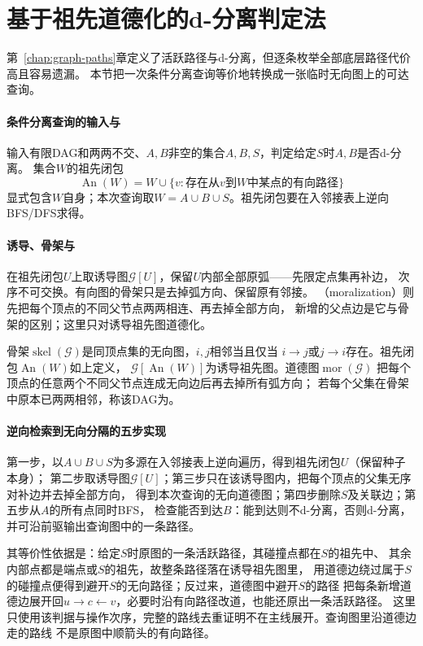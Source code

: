 \section{基于祖先道德化的d-分离判定法}
\label{sec:graph-theory-directed-transformations}

第~\ref{chap:graph-paths}章定义了活跃路径与d-分离，但逐条枚举全部底层路径代价高且容易遗漏。
本节把一次条件分离查询等价地转换成一张临时无向图上的可达查询。

\paragraph{条件分离查询的输入与}
输入有限DAG和两两不交、$A,B$非空的集合$A,B,S$，判定给定$S$时$A,B$是否d-分离。
集合$W$的祖先闭包
\[
  \operatorname{An}(W)=W\cup\{v:\text{存在从}v\text{到}W\text{中某点的有向路径}\}
\]
显式包含$W$自身；本次查询取$W=A\cup B\cup S$。祖先闭包要在入邻接表上逆向BFS/DFS求得。

\paragraph{诱导、骨架与}
在祖先闭包$U$上取诱导图$\mathcal G[U]$，保留$U$内部全部原弧——先限定点集再补边，
次序不可交换。有向图的骨架只是去掉弧方向、保留原有邻接。
（moralization）则先把每个顶点的不同父节点两两相连、再去掉全部方向，
新增的父点边是它与骨架的区别；这里只对诱导祖先图道德化。

\begin{definition}[骨架、祖先闭包与道德图]
  \label{def:graph-theory-directed-structure}
  骨架$\operatorname{skel}(\mathcal G)$是同顶点集的无向图，$i,j$相邻当且仅当
  $i\to j$或$j\to i$存在。祖先闭包$\operatorname{An}(W)$如上定义，
  $\mathcal G[\operatorname{An}(W)]$为诱导祖先图。道德图$\operatorname{mor}(\mathcal G)$
  把每个顶点的任意两个不同父节点连成无向边后再去掉所有弧方向；
  若每个父集在骨架中原本已两两相邻，称该DAG为。
\end{definition}

\paragraph{逆向检索到无向分隔的五步实现}
\begin{algorithm}
  第一步，以$A\cup B\cup S$为多源在入邻接表上逆向遍历，得到祖先闭包$U$（保留种子本身）；
  第二步取诱导图$\mathcal G[U]$；第三步只在该诱导图内，把每个顶点的父集无序对补边并去掉全部方向，
  得到本次查询的无向道德图；第四步删除$S$及关联边；第五步从$A$的所有点同时BFS，
  检查能否到达$B$：能到达则不d-分离，否则d-分离，并可沿前驱输出查询图中的一条路径。
\end{algorithm}
其等价性依据是：给定$S$时原图的一条活跃路径，其碰撞点都在$S$的祖先中、
其余内部点都是端点或$S$的祖先，故整条路径落在诱导祖先图里，
用道德边绕过属于$S$的碰撞点便得到避开$S$的无向路径；反过来，道德图中避开$S$的路径
把每条新增道德边展开回$u\to c\leftarrow v$，必要时沿有向路径改道，也能还原出一条活跃路径。
这里只使用该判据与操作次序，完整的路线去重证明不在主线展开。查询图里沿道德边走的路线
不是原图中顺箭头的有向路径。

